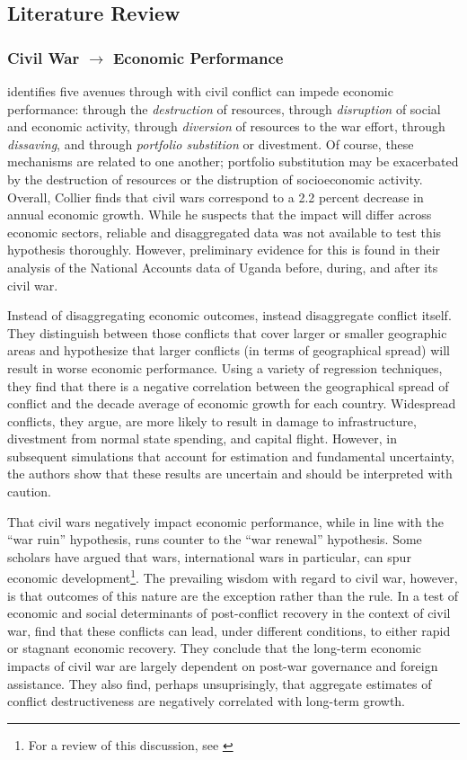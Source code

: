 \subsection{Literature Review}
\label{lit}

\subsubsection{Civil War $\rightarrow$ Economic Performance}

\cite{collier:1999} identifies five avenues through with civil conflict can impede economic performance: through the \textit{destruction} of resources, through \textit{disruption} of social and economic activity, through \textit{diversion} of resources to the war effort, through \textit{dissaving}, and through \textit{portfolio substition} or divestment.  Of course, these mechanisms are related to one another; portfolio substitution may be exacerbated by the destruction of resources or the distruption of socioeconomic activity.  Overall, Collier finds that civil wars correspond to a 2.2 percent decrease in annual economic growth.  While he suspects that the impact will differ across economic sectors, reliable and disaggregated data was not available to test this hypothesis thoroughly.  However, preliminary evidence for this is found in their analysis of the National Accounts data of Uganda before, during, and after its civil war.

Instead of disaggregating economic outcomes, \cite{imai:weinstein:2000} instead disaggregate conflict itself.  They distinguish between those conflicts that cover larger or smaller geographic areas and hypothesize that larger conflicts (in terms of geographical spread) will result in worse economic performance.  Using a variety of regression techniques, they find that there is a negative correlation between the geographical spread of conflict and the decade average of economic growth for each country.  Widespread conflicts, they argue, are more likely to result in damage to infrastructure, divestment from normal state spending, and capital flight.  However, in subsequent simulations that account for estimation and fundamental uncertainty, the authors show that these results are uncertain and should be interpreted with caution.

That civil wars negatively impact economic performance, while in line with the ``war ruin'' hypothesis, runs counter to the ``war renewal'' hypothesis.  Some scholars have argued that wars, international wars in particular, can spur economic development\footnote{For a review of this discussion, see \cite{rasler:thompson:1985}}.  The prevailing wisdom with regard to civil war, however, is that outcomes of this nature are the exception rather than the rule.  In a test of economic and social determinants of post-conflict recovery in the context of civil war, \cite{kang:meernik:2005} find that these conflicts can lead, under different conditions, to either rapid or stagnant economic recovery.  They conclude that the long-term economic impacts of civil war are largely dependent on post-war governance and foreign assistance.  They also find, perhaps unsuprisingly, that aggregate estimates of conflict destructiveness are negatively correlated with long-term growth.

